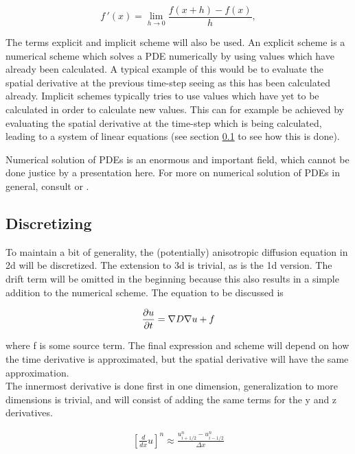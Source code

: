 \begin{equation}\label{derivative_definition}
 f\!\,'(x) = \lim_{h\to 0} \frac{f(x +h) - f(x)}{h},
\end{equation}

The terms explicit and implicit scheme will also be used. 
An explicit scheme is a numerical scheme which solves a PDE numerically by using values which have already been calculated. 
A typical example of this would be to evaluate the spatial derivative at the previous time-step seeing as this has been calculated already. 
Implicit schemes typically tries to use values which have yet to be calculated in order to calculate new values. 
This can for example be achieved by evaluating the spatial derivative at the time-step which is being calculated, leading to a system of linear equations (see section \ref{discretizing} to see how this is done).

Numerical solution of PDEs is an enormous and important field, which cannot be done justice by a presentation here. 
For more on numerical solution of PDEs in general, consult \cite{} or \cite{}.

\subsection{Discretizing}\label{discretizing}

To maintain a bit of generality, the (potentially) anisotropic diffusion equation in 2d will be discretized. 
The extension to 3d is trivial, as is the 1d version. 
The drift term will be omitted in the beginning because this also results in a simple addition to the numerical scheme. The equation to be discussed is 

\begin{equation}
 \frac{\partial u}{\partial t} = \nabla D\nabla u +f
\end{equation}

where f is some source term. 
The final expression and scheme will depend on how the time derivative is approximated, but the spatial derivative will have the same approximation. \\
The innermost derivative is done first in one dimension, generalization to more dimensions is trivial, and will consist of adding the same terms for the y and z derivatives. 

\begin{align*}
 \left[\frac{d}{dx}u\right]^n \approx \frac{u^n_{i+1/2}-u^n_{i-1/2}}{\Delta x}
\end{align*}

